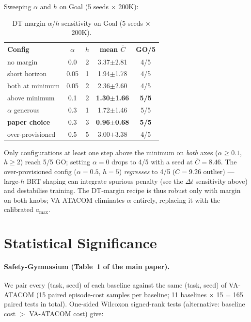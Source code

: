 \documentclass[letterpaper]{article}
\begin{document}
Sweeping $\alpha$ and $h$ on Goal (5 seeds $\times$ 200K):

\begin{table}[t]
\centering
\caption{DT-margin $\alpha$/$h$ sensitivity on Goal (5 seeds $\times$ 200K).}
\label{tab:alpha-h}
\setlength{\tabcolsep}{4pt}
\begin{tabular}{lcccc}
\toprule
Config & $\alpha$ & $h$ & mean $\bar C$ & GO/5 \\
\midrule
no margin            & 0.0  & 2 & 3.37$\pm$2.81 & 4/5 \\
short horizon        & 0.05 & 1 & 1.94$\pm$1.78 & 4/5 \\
both at minimum      & 0.05 & 2 & 2.36$\pm$2.60 & 4/5 \\
above minimum        & 0.1  & 2 & \textbf{1.30$\pm$1.66} & \textbf{5/5} \\
$\alpha$ generous    & 0.3  & 1 & 1.72$\pm$1.46 & 5/5 \\
\textbf{paper choice}& 0.3  & 3 & \textbf{0.96$\pm$0.68} & \textbf{5/5} \\
over-provisioned     & 0.5  & 5 & 3.00$\pm$3.38 & 4/5 \\
\bottomrule
\end{tabular}
\end{table}

Only configurations at least one step above the minimum on \emph{both} axes ($\alpha{\ge}0.1$, $h{\ge}2$) reach 5/5 GO; setting $\alpha{=}0$ drops to 4/5 with a seed at $\bar C{=}8.46$. The over-provisioned config ($\alpha{=}0.5$, $h{=}5$) \emph{regresses} to 4/5 ($\bar C{=}9.26$ outlier) --- large-$h$ BRT shaping can integrate spurious penalty (see the $\Delta t$ sensitivity above) and destabilise training. The DT-margin recipe is thus robust only with margin on both knobs; VA-ATACOM eliminates $\alpha$ entirely, replacing it with the calibrated $a_{\max}$.

\section{Statistical Significance}
\label{sec:stats}

\paragraph{Safety-Gymnasium (Table~1 of the main paper).}
We pair every (task, seed) of each baseline against the same (task, seed) of VA-ATACOM (15 paired episode-cost samples per baseline; 11 baselines $\times$ 15 = 165 paired tests in total). One-sided Wilcoxon signed-rank tests (alternative: baseline cost $>$ VA-ATACOM cost) give:
\end{document}
